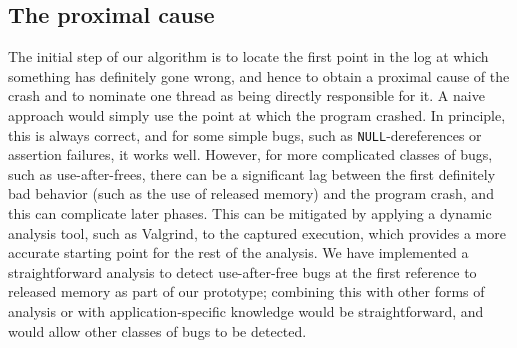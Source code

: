 \documentclass[10pt,twocolumn,preprint,natbib,authoryear]{sigplanconf}
\newcommand{\editorial}[1]{}
\begin{document}

\subsection{The proximal cause}
\label{sect:prox_cause}
The initial step of our algorithm is to locate the first point in the
log at which something has definitely gone wrong, and hence to obtain
a proximal cause of the crash and to nominate one thread as being
directly responsible for it.  A naive approach would simply use the
point at which the program crashed.  In principle, this is always
correct, and for some simple bugs, such as \verb|NULL|-dereferences or
assertion failures, it works well.  However, for more complicated
classes of bugs, such as use-after-frees, there can be a significant
lag between the first definitely bad behavior (such as the use of
released memory) and the program crash, and this can complicate later
phases.  This can be mitigated by applying a dynamic analysis tool,
such as Valgrind\cite{Nethercote2007}, to the captured execution,
which provides a more accurate starting point for the rest of the
analysis.  We have implemented a straightforward analysis to detect
use-after-free bugs at the first reference to released memory as part
of our prototype; combining this with other forms of analysis or with
application-specific knowledge would be straightforward, and would
allow other classes of bugs to be detected.
\end{document}
